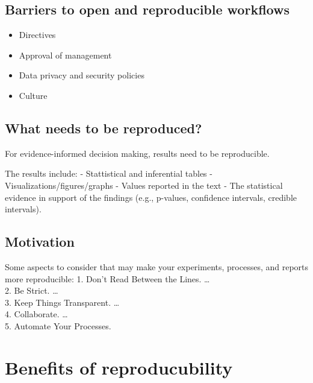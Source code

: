 \documentclass[
]{book}
\providecommand{\tightlist}{%
  \setlength{\itemsep}{0pt}\setlength{\parskip}{0pt}}
\begin{document}
\hypertarget{barriers-to-open-and-reproducible-workflows}{%
\subsection{Barriers to open and reproducible workflows}\label{barriers-to-open-and-reproducible-workflows}}

\begin{itemize}
\tightlist
\item
  Directives\\
\item
  Approval of management\\
\item
  Data privacy and security policies\\
\item
  Culture
\end{itemize}

\hypertarget{what-needs-to-be-reproduced}{%
\subsection{What needs to be reproduced?}\label{what-needs-to-be-reproduced}}

For evidence-informed decision making, results need to be reproducible.

The results include:
- Stattistical and inferential tables
- Visualizations/figures/graphs
- Values reported in the text
- The statistical evidence in support of the findings (e.g., p-values, confidence intervals, credible intervals).

\hypertarget{motivation}{%
\subsection{Motivation}\label{motivation}}

Some aspects to consider that may make your experiments, processes, and reports more reproducible:
1. Don't Read Between the Lines. \ldots{}\\
2. Be Strict. \ldots{}\\
3. Keep Things Transparent. \ldots{}\\
4. Collaborate. \ldots{}\\
5. Automate Your Processes.

\hypertarget{benefits-of-reproducubility}{%
\section{Benefits of reproducubility}\label{benefits-of-reproducubility}}
\end{document}
